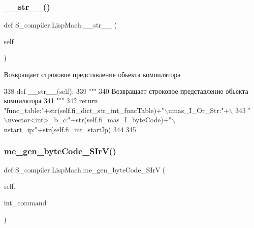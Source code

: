\subsubsection{\texorpdfstring{\+\_\+\+\_\+str\+\_\+\+\_\+()}{\_\_str\_\_()}}
{\footnotesize\ttfamily def S\+\_\+compiler.\+Lisp\+Mach.\+\_\+\+\_\+str\+\_\+\+\_\+ (\begin{DoxyParamCaption}\item[{}]{self }\end{DoxyParamCaption})}

\begin{DoxyVerb}Возвращает строковое представление обьекта компилятора
\end{DoxyVerb}
 
\begin{DoxyCode}
338  \textcolor{keyword}{def }\_\_str\_\_(self):
339      \textcolor{stringliteral}{"""}
340 \textcolor{stringliteral}{          Возвращает строковое представление обьекта компилятора}
341 \textcolor{stringliteral}{     """}     
342      \textcolor{keywordflow}{return} \textcolor{stringliteral}{"func\_table:"}+str(self.fi\_dict\_str\_int\_funcTable)+\textcolor{stringliteral}{"\(\backslash\)nmas\_I\_Or\_Str:"}+\(\backslash\)
343       \textcolor{stringliteral}{"\(\backslash\)nvector<int>\_b\_c:"}+str(self.fi\_mas\_I\_byteCode)+\textcolor{stringliteral}{"\(\backslash\)nstart\_ip:"}+str(self.fi\_int\_startIp)    
344      
345         
\end{DoxyCode}
\mbox{\label{class_s__compiler_1_1_lisp_mach_a5c4b8e5f7cfd068c6d221a83c74019bf}} 
\subsubsection{\texorpdfstring{me\+\_\+gen\+\_\+byte\+Code\+\_\+\+S\+Ir\+V()}{me\_gen\_byteCode\_SIrV()}}
{\footnotesize\ttfamily def S\+\_\+compiler.\+Lisp\+Mach.\+me\+\_\+gen\+\_\+byte\+Code\+\_\+\+S\+IrV (\begin{DoxyParamCaption}\item[{}]{self,  }\item[{}]{int\+\_\+command }\end{DoxyParamCaption})}

